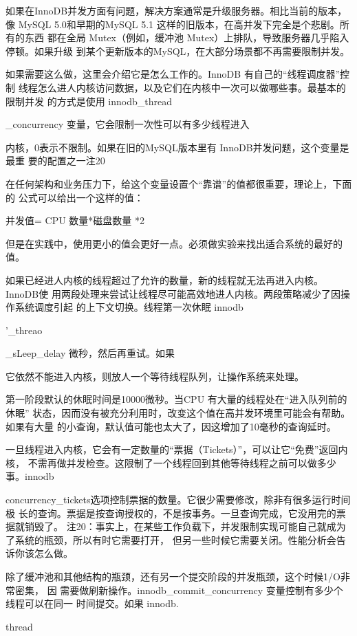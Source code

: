 如果在InnoDB并发方面有问题，解决方案通常是升级服务器。相比当前的版本，像
MySQL 5.0和早期的MySQL 5.1 这样的旧版本，在高并发下完全是个悲剧。所有的东西
都在全局 Mutex（例如，缓冲池 Mutex）上排队，导致服务器几乎陷入停顿。如果升级
到某个更新版本的MySQL，在大部分场景都不再需要限制并发。

如果需要这么做，这里会介绍它是怎么工作的。InnoDB 有自己的“线程调度器”控制
线程怎么进人内核访问数据，以及它们在内核中一次可以做哪些事。最基本的限制并发
的方式是使用 innodb\_thread

\_concurrency 变量，它会限制一次性可以有多少线程进入

内核，0表示不限制。如果在旧的MySQL版本里有 InnoDB并发问题，这个变量是最重
要的配置之一注20

在任何架构和业务压力下，给这个变量设置个“靠谱”的值都很重要，理论上，下面的
公式可以给出一个这样的值：

并发值= CPU 数量*磁盘数量 *2

但是在实践中，使用更小的值会更好一点。必须做实验来找出适合系统的最好的值。

如果已经进人内核的线程超过了允许的数量，新的线程就无法再进入内核。InnoDB使
用两段处理来尝试让线程尽可能高效地进人内核。两段策略减少了因操作系统调度引起
的上下文切换。线程第一次休眠 innodb

'\_threao

\_sLeep\_delay 微秒，然后再重试。如果

它依然不能进入内核，则放人一个等待线程队列，让操作系统来处理。

第一阶段默认的休眠时间是10000微秒。当CPU 有大量的线程处在“进入队列前的休眠”
状态，因而没有被充分利用时，改变这个值在高并发环境里可能会有帮助。如果有大量
的小查询，默认值可能也太大了，因这增加了10毫秒的查询延时。

一旦线程进入内核，它会有一定数量的“票据（Tickets）”，可以让它“免费”返回内核，
不需再做并发检查。这限制了一个线程回到其他等待线程之前可以做多少事。innodb

concurrency\_tickets选项控制票据的数量。它很少需要修改，除非有很多运行时间极
长的查询。票据是按查询授权的，不是按事务。一旦查询完成，它没用完的票据就销毁了。
注20：事实上，在某些工作负载下，并发限制实现可能自己就成为了系统的瓶颈，所以有时它需要打开，
但另一些时候它需要关闭。性能分析会告诉你该怎么做。

除了缓冲池和其他结构的瓶颈，还有另一个提交阶段的并发瓶颈，这个时候1/O非常密集，
因 需要做刷新操作。innodb\_commit\_concurrency 变量控制有多少个线程可以在同一
时间提交。如果 innodb.

thread

